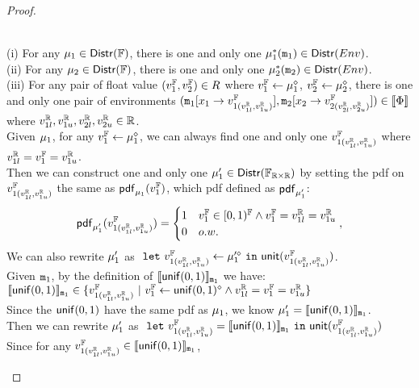 \documentclass[a4paper,11pt]{article}
\begin{document}
\begin{proof}
\begin{itemize}
\begin{subproof}
	\\
	(i) For any $\mu_1 \in \mathsf{Distr}(\mathbb{F})$, there is one and only one $\mu^*_1(\mathtt{m}_1) \in \mathsf{Distr}(Env)$.
	\\
	(ii) For any $\mu_2 \in \mathsf{Distr}(\mathbb{F})$, there is one and only one $\mu^*_2(\mathtt{m}_2) \in \mathsf{Distr}(Env)$.
	\\
	(iii) For any pair of float value $(v^{\mathbb{F}}_1, v^{\mathbb{F}}_2) \in R$ where 
	$v^{\mathbb{F}}_1 \leftarrow \mu_1^{\diamond}$, $v^{\mathbb{F}}_2 \leftarrow \mu_2^{\diamond}$,
	there is one and only one pair of environments 
	$(\mathtt{m}_1[ x_1 \to v^{\mathbb{F}}_{1(v^{\mathbb{R}}_{1l}, v^{\mathbb{R}}_{1u})}], \mathtt{m}_2[x_2 \to v^{\mathbb{F}}_{2(v^{\mathbb{R}}_{2l}, v^{\mathbb{R}}_{2u})}]) \in \llbracket \Phi \rrbracket$
	where $v^{\mathbb{R}}_{1l}, v^{\mathbb{R}}_{1u}, v^{\mathbb{R}}_{2l}, v^{\mathbb{R}}_{2u} \in \mathbb{R}$.
	\\ 
	Given $\mu_1$, for any $v^{\mathbb{F}}_1 \leftarrow \mu_1^{\diamond}$, we can always find one and only one $v^{\mathbb{F}}_{1(v^{\mathbb{R}}_{1l}, v^{\mathbb{R}}_{1u})}$ where $v^{\mathbb{R}}_{1l} = v^{\mathbb{F}}_1 = v^{\mathbb{R}}_{1u}$.
	\\
	Then we can construct one and only one $\mu'_1 \in \mathsf{Distr}(\mathbb{F}_{\mathbb{R} \times \mathbb{R}})$
	by setting the pdf on $v^{\mathbb{F}}_{1(v^{\mathbb{R}}_{1l}, v^{\mathbb{R}}_{1u})}$ the same as $\mathsf{pdf}_{\mu_1}(v^{\mathbb{F}}_1)$, which  
	pdf defined as $\mathsf{pdf}_{\mu'_1}$:
	\[
	\mathsf{pdf}_{\mu'_1}(v^{\mathbb{F}}_{1(v^{\mathbb{R}}_{1l}, v^{\mathbb{R}}_{1u})}) = 
		\begin{cases}
		1 & v^{\mathbb{F}}_1 \in [0, 1)^{\mathbb{F}}
		\land  v^{\mathbb{F}}_1 = v^{\mathbb{R}}_{1l} = v^{\mathbb{R}}_{1u}
		\\
		0       & o.w.
		\end{cases},
	\]
	We can also rewrite $\mu'_1$ as 
	$~\mathtt{let}~ v^{\mathbb{F}}_{1(v^{\mathbb{R}}_{1l}, v^{\mathbb{R}}_{1u})} \leftarrow \mu'^{\diamond}_1 
	~\mathtt{in}~ \mathsf{unit}(v^{\mathbb{F}}_{1(v^{\mathbb{R}}_{1l}, v^{\mathbb{R}}_{1u})})$.
	\\
	Given $\mathtt{m}_1$, by the definition of $\llbracket \mathsf{unif}(0, 1) \rrbracket_{\mathtt{m}_1}$ we have:
	\\
	$ \llbracket \mathsf{unif}(0, 1) \rrbracket_{\mathtt{m}_1} \in  
	\{v^{\mathbb{F}}_{1(v^{\mathbb{R}}_{1l}, v^{\mathbb{R}}_{1u})} 
	~|~ v^{\mathbb{F}}_1 \leftarrow \mathsf{unif}(0, 1)^{\diamond} 
	\land v^{\mathbb{R}}_{1l} = v^{\mathbb{F}}_1 = v^{\mathbb{R}}_{1u}\}$
	\\
	Since the $\mathsf{unif}(0, 1)$ have the same pdf as $\mu_1$, we know $\mu'_1 = \llbracket \mathsf{unif}(0, 1) \rrbracket_{\mathtt{m}_1}$.
	\\
	Then we can rewrite $\mu'_1$ as 
	$~\mathtt{let}~ v^{\mathbb{F}}_{1(v^{\mathbb{R}}_{1l}, v^{\mathbb{R}}_{1u})} = \llbracket \mathsf{unif}(0, 1) \rrbracket_{\mathtt{m}_1} 
	~\mathtt{in}~ \mathsf{unit}(v^{\mathbb{F}}_{1(v^{\mathbb{R}}_{1l}, v^{\mathbb{R}}_{1u})})$
	\\
	Since for any $v^{\mathbb{F}}_{1(v^{\mathbb{R}}_{1l}, v^{\mathbb{R}}_{1u})} \in \llbracket \mathsf{unif}(0, 1) \rrbracket_{\mathtt{m}_1}$, 

\end{subproof}
\end{itemize}
\end{proof}
\end{document}
